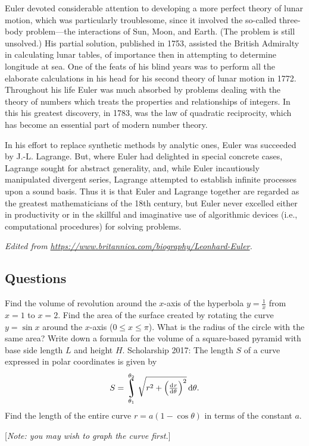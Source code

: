 Euler devoted considerable attention to developing a more perfect theory of lunar motion, which was particularly troublesome, since it involved the so-called three-body problem—the interactions of Sun, Moon, and Earth. (The problem is still unsolved.) His partial solution, published in 1753, assisted the British Admiralty in calculating lunar tables, of importance then in attempting to determine longitude at sea. One of the feats of his blind years was to perform all the elaborate calculations in his head for his second theory of lunar motion in 1772. Throughout his life Euler was much absorbed by problems dealing with the theory of numbers which treats the properties and relationships of integers. In this his greatest discovery, in 1783, was the law of quadratic reciprocity, which has become an essential part of modern number theory.

In his effort to replace synthetic methods by analytic ones, Euler was succeeded by J.-L. Lagrange. But, where Euler had delighted in special concrete cases, Lagrange sought for abstract generality, and, while Euler incautiously manipulated divergent series, Lagrange attempted to establish infinite processes upon a sound basis. Thus it is that Euler and Lagrange together are regarded as the greatest mathematicians of the 18th century, but Euler never excelled either in productivity or in the skillful and imaginative use of algorithmic devices (i.e., computational procedures) for solving problems.

\textit{Edited from \url{https://www.britannica.com/biography/Leonhard-Euler}.}

\subsection*{Questions}
\begin{questions}
  \question Find the volume of revolution around the $ x$-axis of the hyperbola $ y = \frac{1}{x} $ from $ x = 1 $ to $ x = 2 $.
  \question Find the area of the surface created by rotating the curve $ y = \sin x $ around the $ x$-axis ($ 0 \leq x \leq \pi $).
            What is the radius of the circle with the same area?
  \question Write down a formula for the volume of a square-based pyramid with base side length $ L $ and height $ H $.
  \question Scholarship 2017: The length $ S $ of a curve expressed in polar coordinates is given by
            \begin{displaymath}
              S = \rint_{\theta_1}^{\theta_2} \sqrt{r^2 + \left(\od{r}{\theta}\right)^2} \dif{\theta}.
            \end{displaymath}
            Find the length of the entire curve $ r = a (1 - \cos \theta) $ in terms of the constant $ a $.

            [\textit{Note: you may wish to graph the curve first.}]
\end{questions}

